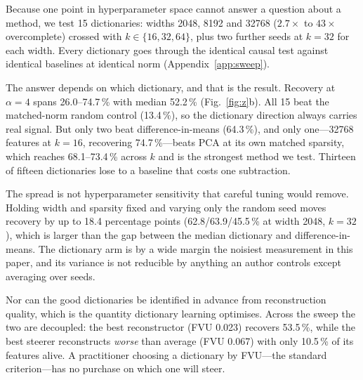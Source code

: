 \documentclass[11pt]{article}
\begin{document}
Because one point in hyperparameter space cannot answer a question about a method, we test 15
dictionaries: widths 2048, 8192 and 32768 ($2.7\times$ to $43\times$ overcomplete) crossed with
$k\in\{16,32,64\}$, plus two further seeds at $k=32$ for each width. Every dictionary goes
through the identical causal test against identical baselines at identical norm
(Appendix~\ref{app:sweep}).

The answer depends on which dictionary, and that is the result. Recovery at $\alpha=4$ spans
26.0--74.7\,\% with median 52.2\,\% (Fig.~\ref{fig:z}b). All 15 beat the matched-norm random
control (13.4\,\%), so the dictionary direction always carries real signal. But only two beat
difference-in-means (64.3\,\%), and only one---32768 features at $k=16$, recovering
74.7\,\%---beats PCA at its own matched sparsity, which reaches 68.1--73.4\,\% across $k$ and is
the strongest method we test. Thirteen of fifteen dictionaries lose to a baseline that costs one
subtraction.

The spread is not hyperparameter sensitivity that careful tuning would remove. Holding width and
sparsity fixed and varying only the random seed moves recovery by up to 18.4 percentage points
(62.8/63.9/45.5\,\% at width 2048, $k=32$), which is larger than the gap between the median
dictionary and difference-in-means. The dictionary arm is by a wide margin the noisiest
measurement in this paper, and its variance is not reducible by anything an author controls
except averaging over seeds.

Nor can the good dictionaries be identified in advance from reconstruction quality, which is the
quantity dictionary learning optimises. Across the sweep the two are decoupled: the best
reconstructor (FVU 0.023) recovers 53.5\,\%, while the best steerer reconstructs \emph{worse}
than average (FVU 0.067) with only 10.5\,\% of its features alive. A practitioner choosing a
dictionary by FVU---the standard criterion---has no purchase on which one will steer.
\end{document}
